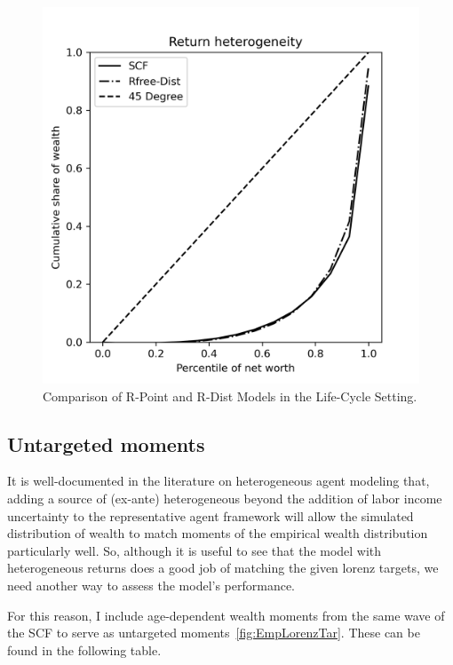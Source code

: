 \begin{figure}[h]
\begin{minipage}{0.48\textwidth}
        \includegraphics[width=\textwidth]{../Figures/LCrrDistNetWorthPlot.png}
    \end{minipage}
    \caption{Comparison of R-Point and R-Dist Models in the Life-Cycle Setting.}
    \label{fig:LCUnif} 
  \end{figure}

\FloatBarrier
\subsection{Untargeted moments}

\par It is well-documented in the literature on heterogeneous agent modeling that, adding a source of (ex-ante) heterogeneous beyond the addition of labor income uncertainty to the representative agent framework will allow the simulated distribution of wealth to match moments of the empirical wealth distribution particularly well. So, although it is useful to see that the model with heterogeneous returns does a good job of matching the given lorenz targets, we need another way to assess the model's performance.

\par For this reason, I include age-dependent wealth moments from the same wave of the SCF to serve as untargeted moments~\ref{fig:EmpLorenzTar}. These can be found in the following table.

